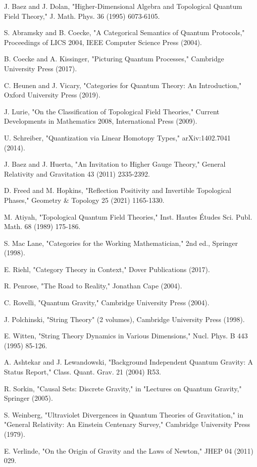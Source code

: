 \documentclass[11pt,a4paper]{article}
\begin{document}
\begin{thebibliography}{99}

 J. Baez and J. Dolan, "Higher-Dimensional Algebra and Topological Quantum Field Theory," J. Math. Phys. 36 (1995) 6073-6105.

 S. Abramsky and B. Coecke, "A Categorical Semantics of Quantum Protocols," Proceedings of LICS 2004, IEEE Computer Science Press (2004).

 B. Coecke and A. Kissinger, "Picturing Quantum Processes," Cambridge University Press (2017).

 C. Heunen and J. Vicary, "Categories for Quantum Theory: An Introduction," Oxford University Press (2019).

 J. Lurie, "On the Classification of Topological Field Theories," Current Developments in Mathematics 2008, International Press (2009).

 U. Schreiber, "Quantization via Linear Homotopy Types," arXiv:1402.7041 (2014).

 J. Baez and J. Huerta, "An Invitation to Higher Gauge Theory," General Relativity and Gravitation 43 (2011) 2335-2392.

 D. Freed and M. Hopkins, "Reflection Positivity and Invertible Topological Phases," Geometry & Topology 25 (2021) 1165-1330.

 M. Atiyah, "Topological Quantum Field Theories," Inst. Hautes Études Sci. Publ. Math. 68 (1989) 175-186.

 S. Mac Lane, "Categories for the Working Mathematician," 2nd ed., Springer (1998).

 E. Riehl, "Category Theory in Context," Dover Publications (2017).

 R. Penrose, "The Road to Reality," Jonathan Cape (2004).

 C. Rovelli, "Quantum Gravity," Cambridge University Press (2004).

 J. Polchinski, "String Theory" (2 volumes), Cambridge University Press (1998).

 E. Witten, "String Theory Dynamics in Various Dimensions," Nucl. Phys. B 443 (1995) 85-126.

 A. Ashtekar and J. Lewandowski, "Background Independent Quantum Gravity: A Status Report," Class. Quant. Grav. 21 (2004) R53.

 R. Sorkin, "Causal Sets: Discrete Gravity," in "Lectures on Quantum Gravity," Springer (2005).

 S. Weinberg, "Ultraviolet Divergences in Quantum Theories of Gravitation," in "General Relativity: An Einstein Centenary Survey," Cambridge University Press (1979).

 E. Verlinde, "On the Origin of Gravity and the Laws of Newton," JHEP 04 (2011) 029.

\end{thebibliography}
\end{document}
